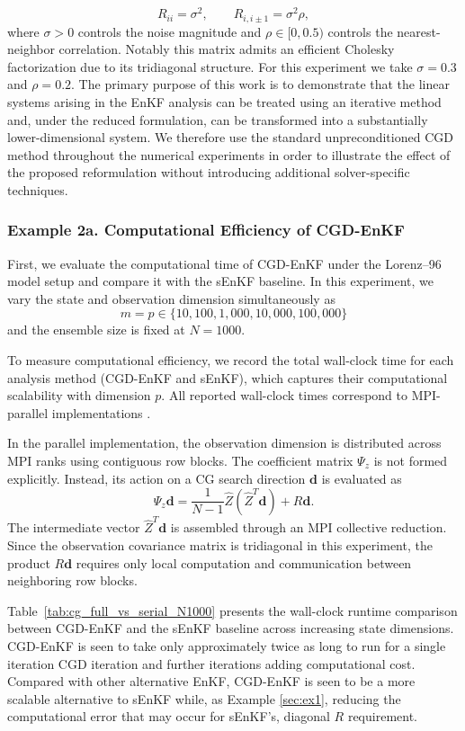 \documentclass[11p]{elsarticle}
\numberwithin{equation}{section}
\begin{document}
\begin{equation}
R_{ii} = \sigma^2, \qquad
R_{i,i\pm1} = \sigma^2\rho,
\end{equation}
where $\sigma > 0$ controls the noise magnitude and $\rho \in [0,0.5)$ controls the nearest-neighbor correlation.  Notably this matrix admits an efficient Cholesky factorization due to its tridiagonal structure.  For this experiment we take $\sigma=0.3$ and $\rho = 0.2$.
{
The primary purpose of this work is to demonstrate that the linear
systems arising in the EnKF analysis can be treated using an
iterative method and, under the reduced formulation, can be
transformed into a substantially lower-dimensional system. We
therefore use the standard unpreconditioned CGD method throughout
the numerical experiments in order to illustrate the effect of the
proposed reformulation without introducing additional
solver-specific techniques.}

\subsubsection{Example 2a. Computational Efficiency of CGD-EnKF}
First, we evaluate the computational time of CGD-EnKF
under the Lorenz--96 model setup and compare it with the sEnKF baseline. In this experiment, we vary the state and observation
dimension simultaneously as
\[
m = p \in \{10,100, 1{,}000, 10{,}000, 100{,}000\}
\]
and the ensemble size is fixed at $N=1000$.

To measure computational efficiency, we record the total wall-clock
time for each analysis method (CGD-EnKF and sEnKF), which
captures their computational scalability with dimension $p$.
All reported wall-clock times correspond to MPI-parallel
implementations .

{
In the parallel implementation, the observation dimension is
distributed across MPI ranks using contiguous row blocks. The
coefficient matrix $\Psi_z$ is not formed explicitly. Instead, its
action on a CG search direction $\bm d$ is evaluated as
\[
\Psi_z\bm d
=
\frac{1}{N-1}\widehat Z
\left(\widehat Z^T\bm d\right)+R\bm d.
\]
The intermediate vector $\widehat Z^T\bm d$ is assembled through
an MPI collective reduction. Since the observation covariance
matrix is tridiagonal in this experiment, the product $R\bm d$
requires only local computation and communication between
neighboring row blocks.
}

Table~\ref{tab:cg_full_vs_serial_N1000}
presents the wall-clock runtime comparison between CGD-EnKF and the sEnKF baseline across increasing state dimensions.  CGD-EnKF is seen to take only approximately twice as long to run for a single iteration CGD iteration and further iterations adding computational cost.  Compared with other alternative EnKF, CGD-EnKF is seen to be a more scalable alternative to sEnKF while, as Example \ref{sec:ex1}, reducing the computational error that may occur for sEnKF's, diagonal $R$ requirement.
\end{document}
